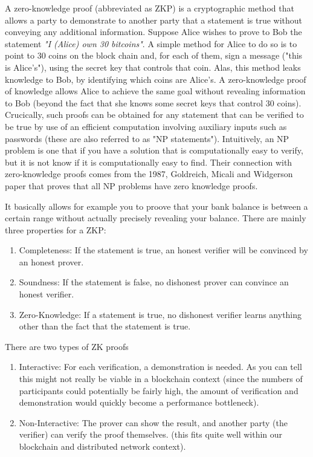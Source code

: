 \documentclass{article}
\begin{document}
A zero-knowledge proof (abbreviated as ZKP) is a cryptographic method that allows a party to demonstrate to another party that a statement is true without conveying any additional information. Suppose Alice wishes to prove to Bob the statement \textit{"I (Alice) own 30 bitcoins"}. A simple method for Alice to do so is to point to 30 coins on the block chain and, for each of them, sign a message ("this is Alice's"), using the secret key that controls that coin. Alas, this method leaks knowledge to Bob, by identifying which coins are Alice's. A zero-knowledge proof of knowledge allows Alice to achieve the same goal without revealing information to Bob (beyond the fact that she knows some secret keys that control 30 coins). Crucically, such proofs can be obtained for any statement that can be verified to be true by use of an efficient computation involving auxiliary inputs such as passwords (these are also referred to as "NP statements"). Intuitively, an NP problem is one that if you have a solution that is computationally easy to verify, but it is not know if it is computationally easy to find. Their connection with zero-knowledge proofs comes from the 1987, Goldreich, Micali and Widgerson paper that proves that all NP problems have zero knowledge proofs.

It basically allows for example you to proove that your bank balance is between a certain range without actually precisely revealing your balance. There are mainly three properties for a ZKP:


\begin{enumerate}
    \item Completeness: If the statement is true, an honest verifier will be convinced by an honest prover.
    \item Soundness: If the statement is false, no dishonest prover can convince an honest verifier.
    \item Zero-Knowledge: If a statement is true, no dishonest verifier learns anything other than the fact that the statement is true.
\end{enumerate}

There are two types of ZK proofs

\begin{enumerate}
    \item Interactive: For each verification, a demonstration is needed. As you can tell this might not really be viable in a blockchain context (since the numbers of participants could potentially be fairly high, the amount of verification and demonstration would quickly become a performance bottleneck). 
    
    \item Non-Interactive: The prover can show the result, and another party (the verifier) can verify the proof themselves. (this fits quite well within our blockchain and distributed network context).
\end{enumerate}
\end{document}
